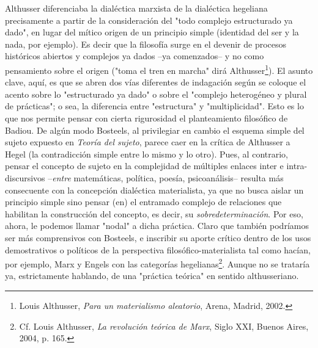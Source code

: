 \documentclass{book}
\begin{document}
Althusser diferenciaba la dialéctica marxista de la dialéctica hegeliana
precisamente a partir de la consideración del "todo complejo
estructurado ya dado", en lugar del mítico origen de un principio simple
(identidad del ser y la nada, por ejemplo). Es decir que la filosofía
surge en el devenir de procesos históricos abiertos y complejos ya dados
--ya comenzados-- y no como pensamiento sobre el origen ("toma el tren
en marcha" dirá Althusser\footnote{Louis Althusser, \emph{Para un
  materialismo aleatorio}, Arena, Madrid, 2002.}). El asunto clave,
aquí, es que se abren dos vías diferentes de indagación según se coloque
el acento sobre lo "estructurado ya dado" o sobre el "complejo
heterogéneo y plural de prácticas"; o sea, la diferencia entre
"estructura" y "multiplicidad". Esto es lo que nos permite pensar con
cierta rigurosidad el planteamiento filosófico de Badiou. De algún modo
Bosteels, al privilegiar en cambio el esquema simple del sujeto expuesto
en \emph{Teoría del sujeto}, parece caer en la crítica de Althusser a
Hegel (la contradicción simple entre lo mismo y lo otro). Pues, al
contrario, pensar el concepto de sujeto en la complejidad de múltiples
enlaces inter e intra-discursivos --\emph{entre} matemáticas, política,
poesía, psicoanálisis-- resulta más consecuente con la concepción
dialéctica materialista, ya que no busca aislar un principio simple sino
pensar (en) el entramado complejo de relaciones que habilitan la
construcción del concepto, es decir, su \emph{sobredeterminación}. Por
eso, ahora, le podemos llamar "nodal" a dicha práctica. Claro que
también podríamos ser más comprensivos con Bosteels, e inscribir su
aporte crítico dentro de los usos demostrativos o políticos de la
perspectiva filosófico-materialista tal como hacían, por ejemplo, Marx y
Engels con las categorías hegelianas\footnote{Cf. Louis Althusser,
  \emph{La revolución teórica de Marx}, Siglo XXI, Buenos Aires, 2004,
  p. 165.}. Aunque no se trataría ya, estrictamente hablando, de una
"práctica teórica" en sentido althusseriano.
\end{document}
